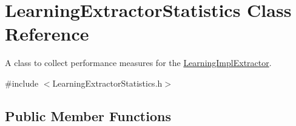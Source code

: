 \hypertarget{classLearningExtractorStatistics}{\section{Learning\-Extractor\-Statistics Class Reference}
\label{classLearningExtractorStatistics}
}


A class to collect performance measures for the \hyperlink{classLearningImplExtractor}{Learning\-Impl\-Extractor}.  




{\ttfamily \#include $<$Learning\-Extractor\-Statistics.\-h$>$}

\subsection*{Public Member Functions}
